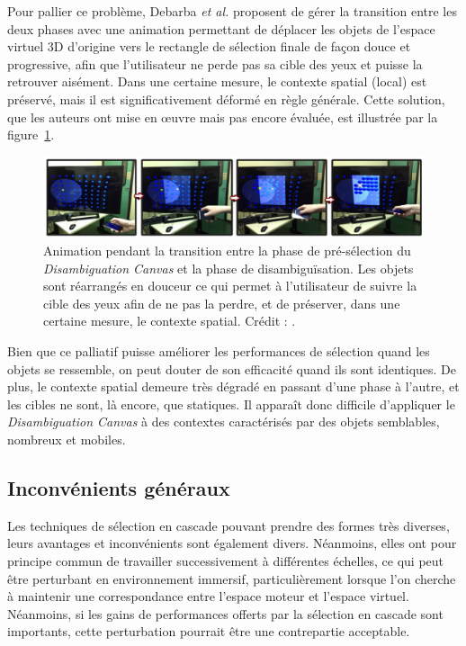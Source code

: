 	Pour pallier ce problème, Debarba \emph{et al.} proposent de gérer la transition entre les deux phases avec une animation permettant de déplacer les objets de l'espace virtuel 3D d'origine vers le rectangle de sélection finale de façon \og douce \fg{} et progressive, afin que l'utilisateur ne perde pas sa cible des yeux et puisse la retrouver aisément. Dans une certaine mesure, le contexte spatial (local) est préservé, mais il est significativement déformé en règle générale. Cette solution, que les auteurs ont mise en \oe{}uvre mais pas encore évaluée, est illustrée par la figure~\ref{fig:dCanvasContext}.
	
	\begin{figure}[H]
		\centering
		\includegraphics[width=\textwidth]{figures/ch2/dCanvasContext}
		\caption[\emph{Disambiguation Canvas} -- animation de transition]{Animation pendant la transition entre la phase de pré-sélection du \emph{Disambiguation Canvas} et la phase de disambiguïsation. Les objets sont réarrangés \og en douceur \fg{} ce qui permet à l'utilisateur de suivre la cible des yeux afin de ne pas la perdre, et de préserver, dans une certaine mesure, le contexte spatial. Crédit : \cite{debarba2013disambiguation}.}
		\label{fig:dCanvasContext}
	\end{figure}
	
	Bien que ce palliatif puisse améliorer les performances de sélection quand les objets se ressemble, on peut douter de son efficacité quand ils sont identiques. De plus, le contexte spatial demeure très dégradé en passant d'une phase à l'autre, et les cibles ne sont, là encore, que statiques. Il apparaît donc difficile d'appliquer le \emph{Disambiguation Canvas} à des contextes caractérisés par des objets semblables, nombreux et mobiles.
	
	\subsection{Inconvénients généraux}
	Les techniques de sélection en cascade pouvant prendre des formes très diverses, leurs avantages et inconvénients sont également divers. Néanmoins, elles ont pour principe commun de travailler successivement à différentes échelles, ce qui peut être perturbant en environnement immersif, particulièrement lorsque l'on cherche à maintenir une correspondance entre l'espace moteur et l'espace virtuel. Néanmoins, si les gains de performances offerts par la sélection en cascade sont importants, cette perturbation pourrait être une contrepartie acceptable.
	
